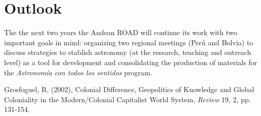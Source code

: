 \documentclass{iau}
\begin{document}
\section{Outlook}
The the next two years the Andean ROAD will continue its work with two
important goals in mind: organizing two regional meetings (Per\'u
and Bolvia) to discuss strategies to stablish astronomy (at the research,
teaching and outreach level) as a tool for development and
consolidating the production of materials for the \emph{Astronom\'ia
  con todos los sentidos} program.  

\begin{thebibliography}{}

{Grosfoguel, R. (2002)}, {Colonial Difference, Geopolitics of Knowledge
  and Global Coloniality 
  in the Modern/Colonial Capitalist World System}, 
\textit{Review} 19, 2, pp. 131-154.


\end{thebibliography}
\end{document}

